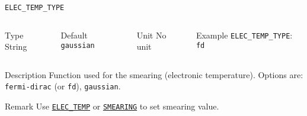 \documentclass[xcolor=dvipsnames,t]{beamer}
\begin{document}
\begin{frame}[allowframebreaks]{\texttt{ELEC\_TEMP\_TYPE}} \label{ELEC_TEMP_TYPE}
\vspace*{-12pt}
\begin{columns}
\begin{block}{Type}
String
\end{block}

\begin{block}{Default}
\texttt{gaussian}
\end{block}

\begin{block}{Unit}
No unit
\end{block}

\begin{block}{Example}
\texttt{ELEC\_TEMP\_TYPE}: \texttt{fd}
\end{block}
\end{columns}

\begin{block}{Description}
Function used for the smearing (electronic temperature). Options are: \texttt{fermi-dirac} (or \texttt{fd}), \texttt{gaussian}.
\end{block}

\begin{block}{Remark}
Use \hyperlink{ELEC_TEMP}{\texttt{ELEC\_TEMP}} or \hyperlink{SMEARING}{\texttt{SMEARING}} to set smearing value.
\end{block}

\end{frame}
\end{document}
